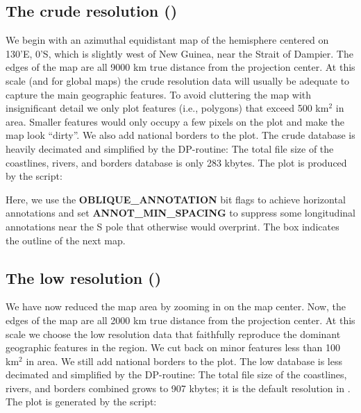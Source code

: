 
\subsection{The crude resolution ()} 

We begin with an azimuthal equidistant map of the hemisphere
centered on 130'E, 0'S, which is slightly west
of New Guinea, near the Strait of Dampier.  The edges of the
map are all 9000 km true distance from the projection center.
At this scale (and for global maps) the crude resolution data
will usually be adequate to capture the main geographic features.
To avoid cluttering the map with insignificant detail we only
plot features (i.e., polygons) that exceed 500 km$^2$ in area.
Smaller features would only occupy a few pixels on the plot and
make the map look ``dirty''.  We also add national borders to
the plot.  The crude database is heavily decimated and simplified
by the DP-routine: The total file size of the coastlines, rivers,
and borders database is only 283 kbytes.  The plot is produced by the
script:



Here, we use the {\bf OBLIQUE\_ANNOTATION} bit flags to achieve
horizontal annotations and set {\bf ANNOT\_MIN\_SPACING} to suppress some longitudinal
annotations near the S pole that otherwise would overprint.
The box indicates the outline of the next map.


\subsection{The low resolution ()} 

We have now reduced the map area by zooming in on the map center.
Now, the edges of the map are all 2000 km true distance from
the projection center.  At this scale we choose the low resolution
data that faithfully reproduce the dominant geographic features
in the region.  We cut back on minor features less than 100 km$^2$
in area.  We still add national borders to the plot.  The low
database is less decimated and simplified by the DP-routine: The
total file size of the coastlines, rivers, and borders combined
grows to 907 kbytes; it is the default resolution in \GMT.  The
plot is generated by the script:

